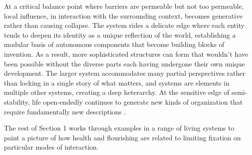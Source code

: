 \documentclass[11pt]{article}
\begin{document}

At a critical balance point where barriers are permeable but not too permeable, local influence, in interaction with the surrounding context, becomes generative rather than causing collapse. The system rides a delicate edge where each entity tends to deepen its identity as a unique reflection of the world, establishing a modular basis of autonomous components that become building blocks of invention. As a result, more sophisticated structures can form that wouldn't have been possible without the diverse parts each having undergone their own unique development. The larger system accommodates many partial perspectives rather than locking in a single story of what matters, and systems are elements in multiple other systems, creating a deep heterarchy. At the sensitive edge of semi-stability, life open-endedly continues to generate new kinds of organization that require fundamentally new descriptions \citep{kauffman1993origins, stanley2017open, langton1990computation, simon1962architecture, schrodinger1944what, prigogine1984order, maturana2012autopoiesis}.

The rest of Section 1 works through examples in a range of living systems to paint a picture of how health and flourishing are related to limiting fixation on particular modes of interaction. 







 
\end{document}
